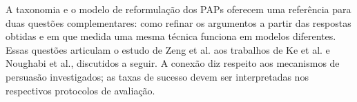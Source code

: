 A taxonomia e o modelo de reformulação dos PAPs oferecem uma referência para duas questões complementares: como refinar os argumentos a partir das respostas obtidas e em que medida uma mesma técnica funciona em modelos diferentes. Essas questões articulam o estudo de Zeng et al. aos trabalhos de Ke et al. e Noughabi et al., discutidos a seguir. A conexão diz respeito aos mecanismos de persuasão investigados; as taxas de sucesso devem ser interpretadas nos respectivos protocolos de avaliação.
